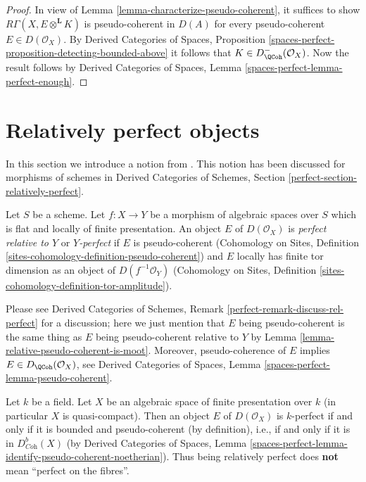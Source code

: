 \begin{proof}
In view of Lemma \ref{lemma-characterize-pseudo-coherent}, it suffices
to show $R \Gamma (X, E \otimes ^{\mathbf{L}} K)$ is
pseudo-coherent in $D(A)$ for every pseudo-coherent 
$E \in D(\mathcal{O}_X)$. By Derived Categories of Spaces,
Proposition \ref{spaces-perfect-proposition-detecting-bounded-above}
it follows that $K \in D^-_\QCoh (\mathcal{O}_X)$. Now the
result follows by Derived Categories of Spaces, Lemma
\ref{spaces-perfect-lemma-perfect-enough}.
\end{proof}












\section{Relatively perfect objects}
\label{section-relatively-perfect}

\noindent
In this section we introduce a notion from \cite{lieblich-complexes}.
This notion has been discussed for morphisms of schemes in
Derived Categories of Schemes, Section
\ref{perfect-section-relatively-perfect}.

\begin{definition}
\label{definition-relatively-perfect}
Let $S$ be a scheme. Let $f : X \to Y$ be a morphism of algebraic spaces
over $S$ which is flat and locally of finite presentation.
An object $E$ of $D(\mathcal{O}_X)$ is {\it perfect relative to $Y$} or
{\it $Y$-perfect} if $E$ is pseudo-coherent
(Cohomology on Sites, Definition
\ref{sites-cohomology-definition-pseudo-coherent}) and
$E$ locally has finite tor dimension as an object of
$D(f^{-1}\mathcal{O}_Y)$
(Cohomology on Sites, Definition
\ref{sites-cohomology-definition-tor-amplitude}).
\end{definition}

\noindent
Please see Derived Categories of Schemes,
Remark \ref{perfect-remark-discuss-rel-perfect} for a discussion;
here we just mention that $E$ being pseudo-coherent is the
same thing as $E$ being pseudo-coherent relative to $Y$ by
Lemma \ref{lemma-relative-pseudo-coherent-is-moot}.
Moreover, pseudo-coherence of $E$ implies $E \in D_\QCoh(\mathcal{O}_X)$, see
Derived Categories of Spaces, Lemma
\ref{spaces-perfect-lemma-pseudo-coherent}.

\begin{example}
\label{example-relatively-perfect-field}
Let $k$ be a field. Let $X$ be an algebraic space of finite presentation
over $k$ (in particular $X$ is quasi-compact). Then an object $E$ of
$D(\mathcal{O}_X)$ is $k$-perfect if and only if it is bounded and
pseudo-coherent (by definition), i.e., if and only if it is in
$D^b_{\textit{Coh}}(X)$ (by
Derived Categories of Spaces, Lemma
\ref{spaces-perfect-lemma-identify-pseudo-coherent-noetherian}).
Thus being relatively perfect does {\bf not} mean ``perfect on the fibres''.
\end{example}


